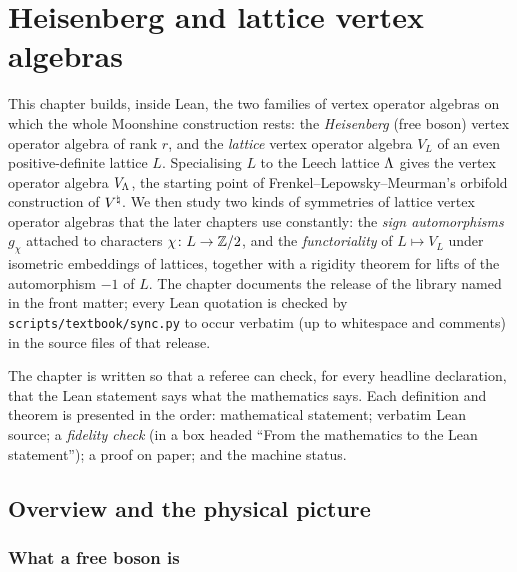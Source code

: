 \chapter{Heisenberg and lattice vertex algebras}\label{ch:03}
\begingroup\sloppy

\providecommand{\chthreeV}{V}
\providecommand{\chthreeF}{\mathcal{F}}
\providecommand{\chthreeeps}{\varepsilon}
\providecommand{\chthreecoc}{\operatorname{coc}}
\providecommand{\chthreeR}{\mathbb{R}}

This chapter builds, inside Lean, the two families of vertex operator algebras on which the whole
Moonshine construction rests: the \emph{Heisenberg} (free boson) vertex operator algebra of rank
$r$, and the \emph{lattice} vertex operator algebra $V_L$ of an even positive-definite lattice
$L$. Specialising $L$ to the Leech lattice ${\Lambda}$ gives the vertex operator algebra $V_{\Lambda}$,
the starting point of Frenkel--Lepowsky--Meurman's orbifold construction of ${V^{\natural}}$. We then
study two kinds of symmetries of lattice vertex operator algebras that the later chapters use
constantly: the \emph{sign automorphisms} $g_\chi$ attached to characters $\chi\colon L\to{\mathbb{Z}}/2$,
and the \emph{functoriality} of $L\mapsto V_L$ under isometric embeddings of lattices, together with
a rigidity theorem for lifts of the automorphism $-1$ of $L$. The chapter documents the release of the library named in the front matter; every Lean
quotation is checked by \texttt{scripts/textbook/sync.py} to occur verbatim (up to whitespace and
comments) in the source files of that release.

The chapter is written so that a referee can check, for every headline declaration, that the Lean
statement says what the mathematics says. Each definition and theorem is presented in the order:
mathematical statement; verbatim Lean source; a \emph{fidelity check} (in a box headed ``From the
mathematics to the Lean statement''); a proof on paper; and the machine status.

\section{Overview and the physical picture}\label{ch03:sec:overview}

\subsection{What a free boson is}

